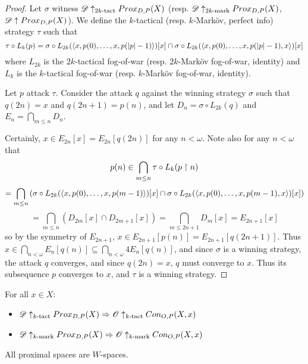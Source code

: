 \begin{proof}
Let $\sigma$ witness $\mathscr{D} \uparrow_{2k\text{-tact}}Prox_{D,P}(X)$ (resp. $\mathscr{D} \uparrow_{2k\text{-mark}}Prox_{D,P}(X)$, $\mathscr{D}\uparrow Prox_{D,P}(X)$). We define the $k$-tactical (resp. $k$-Mark\"ov, perfect info) strategy $\tau$ such that
  \[
    \tau\circ L_k(p)
      =
    \sigma\circ L_{2k}(\langle x,p(0),\dots,x,p(|p|-1)\rangle)[x]
      \cap
    \sigma\circ L_{2k}(\langle x,p(0),\dots,x,p(|p|-1),x\rangle)[x]
  \]
where $L_{2k}$ is the $2k$-tactical fog-of-war (resp. $2k$-Mark\"ov fog-of-war, identity) and $L_{k}$ is the $k$-tactical fog-of-war (resp. $k$-Mark\"ov fog-of-war, identity).

Let $p$ attack $\tau$. Consider the attack $q$ against the winning strategy $\sigma$ such that $q(2n)=x$ and $q(2n+1)=p(n)$, and let $D_n=\sigma\circ L_{2k}(q)$ and $E_n=\bigcap_{m\leq n}D_n$.

Certainly, $x\in E_{2n}[x]= E_{2n}[q(2n)]$ for any $n<\omega$. Note also for any $n<\omega$ that 
    \[
      p(n) \in 
      \bigcap_{m\leq n}\tau\circ L_k(p\restriction n)
    \]
    \[
      =
      \bigcap_{m\leq n}\left(
        \sigma\circ L_{2k}(\langle x,p(0),\dots,x,p(m-1)\rangle)[x]\cap
        \sigma\circ L_{2k}(\langle x,p(0),\dots,x,p(m-1),x\rangle)[x]
      \right)
    \]
    \[
      =
      \bigcap_{m\leq n}\left(
        D_{2m}[x]\cap
        D_{2m+1}[x]
      \right) =
      \bigcap_{m\leq 2n+1} D_m[x]=E_{2n+1}[x]
    \]
so by the symmetry of $E_{2n+1}$, $x\in E_{2n+1}[p(n)]= E_{2n+1}[q(2n+1)]$. Thus $x\in \bigcap_{n<\omega} E_n[q(n)]\subseteq \bigcap_{n<\omega} 4E_n[q(n)]$, and since $\sigma$ is a winning strategy, the attack $q$ converges, and since $q(2n)=x$, $q$ must converge to $x$. Thus its subsequence $p$ converges to $x$, and $\tau$ is a winning strategy.
\end{proof}

\begin{corollary}
For all $x\in X$:
  \begin{itemize}
    \item
      $\mathscr{D}\uparrow_{k\text{-tact}} Prox_{D,P}(X) \Rightarrow \mathscr{O} \uparrow_{k\text{-tact}} Con_{O,P}(X,x)$
    \item
      $\mathscr{D}\uparrow_{k\text{-mark}} Prox_{D,P}(X) \Rightarrow \mathscr{O} \uparrow_{k\text{-mark}} Con_{O,P}(X,x)$
  \end{itemize}
\end{corollary}

\begin{corollary}
  All proximal spaces are $W$-spaces.
\end{corollary}


